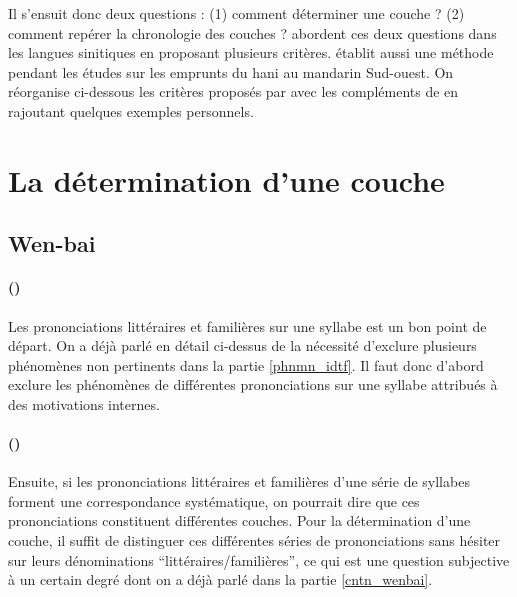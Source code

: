 \documentclass{scrbook}
\newcounter{c}[subsubsection]
\newcommand{\stpc}[1]{\stepcounter{#1}}
\begin{document}
\begin{sloppypar}
Il s'ensuit donc deux questions : (1) comment déterminer une couche ? (2) comment repérer la chronologie des couches ? \textcite{Chen2003yu, Chen2005couche} abordent ces deux questions dans les langues sinitiques en proposant plusieurs critères. \textcite[14--17]{Sagart2001hani} établit aussi une méthode pendant les études sur les emprunts du hani au mandarin Sud-ouest. On réorganise ci-dessous les critères proposés par \textcite{Chen2003yu, Chen2005couche} avec les compléments de \textcite[14--17]{Sagart2001hani} en rajoutant quelques exemples personnels.

\section{La détermination d'une couche}

\subsection{Wen-bai}\label{sec:critère_wenbai_1}
\stpc{c}\paragraph{()}
Les prononciations littéraires et familières sur une syllabe est un bon point de départ. On a déjà parlé en détail ci-dessus de la nécessité d'exclure plusieurs phénomènes non pertinents dans la partie \ref{phnmn_idtf}. Il faut donc d'abord exclure les phénomènes de différentes prononciations sur une syllabe attribués à des motivations internes.

\stpc{c}\paragraph{()}
Ensuite, si les prononciations littéraires et familières d'une série de syllabes forment une correspondance systématique, on pourrait dire que ces prononciations constituent différentes couches. Pour la détermination d'une couche, il suffit de distinguer ces différentes séries de prononciations sans hésiter sur leurs dénominations ``littéraires/familières'', ce qui est une question subjective à un certain degré dont on a déjà parlé dans la partie \ref{cntn_wenbai}. 


\end{sloppypar}
\end{document}
